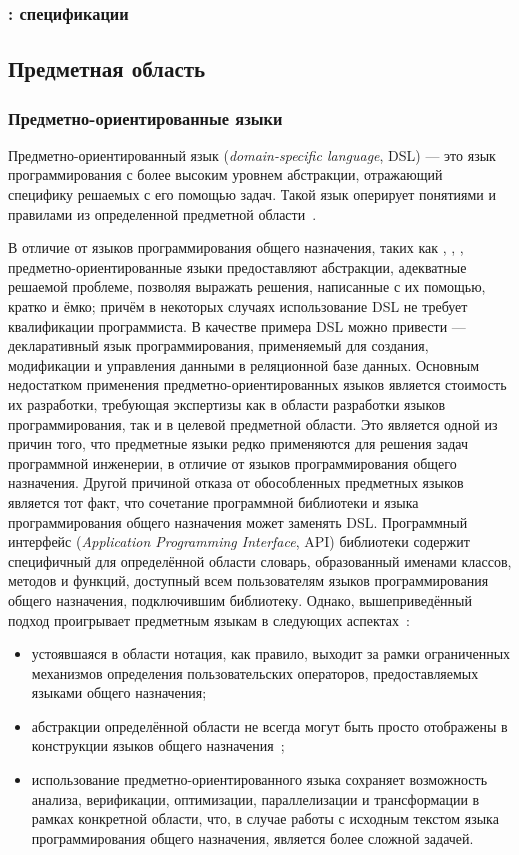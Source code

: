 \subsubsection{: спецификации}

\subsection{Предметная область}
\subsubsection{Предметно-ориентированные языки}
\label{dsl-section}
Предметно-ориентированный язык (\textit{domain-specific language}, DSL) ---
это язык программирования с более высоким уровнем абстракции,
отражающий специфику решаемых с его помощью задач. Такой язык оперирует
понятиями и правилами из определенной предметной области~\cite{book-of-dsls}.

В отличие от языков программирования общего назначения, таких как ,
, , предметно-ориентированные языки предоставляют
абстракции, адекватные решаемой проблеме, позволяя выражать решения,
написанные с их помощью, кратко и ёмко; причём в некоторых случаях
использование DSL не требует квалификации программиста.
В качестве примера DSL можно привести  ---  декларативный язык
программирования, применяемый для создания, модификации и управления данными в
реляционной базе данных.
Основным недостатком применения предметно-ориентированных языков является
стоимость их разработки, требующая экспертизы как в области разработки языков
программирования, так и в целевой предметной области.
Это является одной из причин того, что предметные языки редко применяются
для решения задач программной инженерии, в отличие от языков программирования
общего назначения.
Другой причиной отказа от обособленных предметных языков является тот факт,
что сочетание программной библиотеки и языка программирования общего
назначения может заменять DSL.
Программный интерфейс (\textit{Application Programming Interface},
API) библиотеки содержит специфичный для определённой
области словарь, образованный именами классов, методов и функций, доступный
всем пользователям языков программирования общего назначения, подключившим
библиотеку.
Однако, вышеприведённый подход проигрывает предметным языкам в следующих
аспектах~\cite{when-and-how-develop-dsl,dsl-spectrum-wile}:
\begin{itemize}
	\item устоявшаяся в области нотация, как правило, выходит за рамки
	ограниченных механизмов определения пользовательских операторов,
	предоставляемых языками общего назначения;
	\item абстракции определённой области не всегда могут быть
	просто отображены в конструкции языков общего назначения~\cite{dsl-traversal-transform};
	\item использование предметно-ориентированного языка сохраняет
	возможность анализа, верификации, оптимизации, параллелизации и
	трансформации в рамках конкретной области, что, в случае работы с
	исходным текстом языка программирования общего назначения, является
	более сложной задачей.
\end{itemize}

